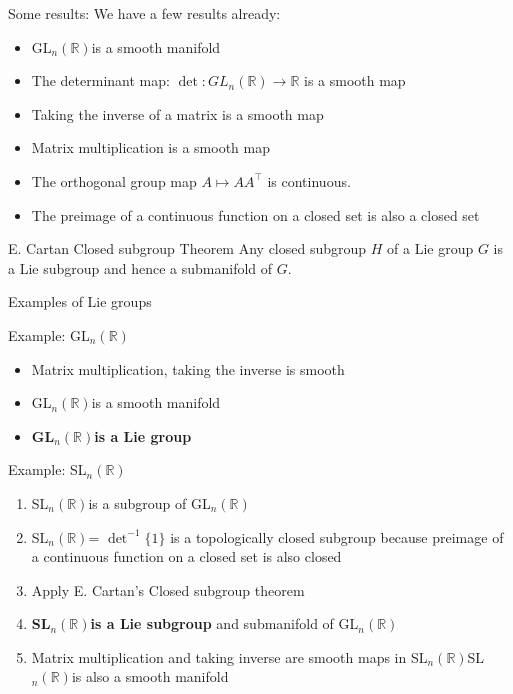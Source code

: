 \documentclass[smaller,xcolor=dvipsnames]{beamer}
\newcommand{\gln}{GL$_{n}(\mathbb{R})$}
\newcommand{\sln}{SL$_n(\mathbb{R})$}
\begin{document}
\begin{frame}{Some results:}
We have a few results already:
\begin{itemize}
    \item \gln is a smooth manifold
    \item The determinant map: $\det: GL_{n}(\mathbb{R}) \rightarrow \mathbb{R}$ is a smooth map
    \item Taking the inverse of a matrix is a smooth map
    \item Matrix multiplication is a smooth map
    \item The orthogonal group map $A \mapsto AA^{\top}$ is continuous. 
    \item The preimage of a continuous function on a closed set is also a closed set
\end{itemize}
\begin{block}{E. Cartan Closed subgroup Theorem}
Any closed subgroup $H$ of a Lie group $G$ is a Lie subgroup and hence a submanifold of $G$.
\end{block}
\end{frame}

\begin{frame}{Examples of Lie groups}
    \begin{block}{Example: \gln}
    \begin{itemize}
        \item Matrix multiplication, taking the inverse is smooth
        \item \gln is a smooth manifold
        \item \textbf{\gln is a Lie group}
    \end{itemize}
    \end{block}
    \pause
    \begin{block}{Example: \sln}
    \begin{enumerate}
        \item \sln is a subgroup of \gln
        \pause 
        \item \sln = $\det^{-1}\{1\}$ is a topologically closed subgroup because \pause preimage of a continuous function on a closed set is also closed
        \pause
        \item Apply E. Cartan's Closed subgroup theorem\pause
        \item \textbf{\sln is a Lie subgroup} and submanifold of \gln\pause 
        \item Matrix multiplication and taking inverse are smooth maps in \sln \implies \sln is also a smooth manifold
    \end{enumerate}
    \end{block}
\end{frame}
\end{document}
